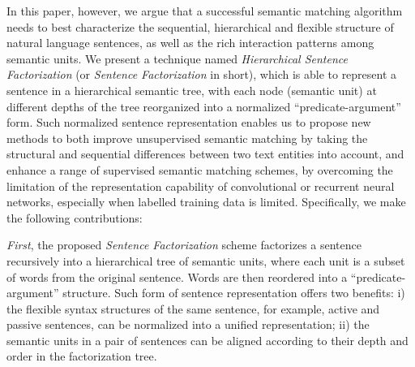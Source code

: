 In this paper, however, we argue that a successful semantic matching algorithm needs to best characterize the sequential, hierarchical and flexible structure of natural language sentences, as well as the rich interaction patterns among semantic units.
We present a technique named \textit{Hierarchical Sentence Factorization} (or \emph{Sentence Factorization} in short), which is able to represent a sentence in a hierarchical semantic tree, with each node (semantic unit) at different depths of the tree reorganized into a normalized ``predicate-argument'' form.
Such normalized sentence representation enables us to propose new methods to both improve unsupervised semantic matching by taking the structural and sequential differences between two text entities into account, and enhance a range of supervised semantic matching schemes, by overcoming the limitation of the representation capability of convolutional or recurrent neural networks, especially when labelled training data is limited.
Specifically, we make the following contributions:





\textit{First}, the proposed \textit{Sentence Factorization} scheme factorizes a sentence recursively into a hierarchical tree of semantic units, where each unit is a subset of words from the original sentence.
Words are then reordered into a ``predicate-argument'' structure.
Such form of sentence representation offers two benefits: i) the flexible syntax structures of the same sentence, for example, active and passive sentences, can be normalized into a unified representation; ii) the semantic units in a pair of sentences can be aligned according to their depth and order in the factorization tree.

